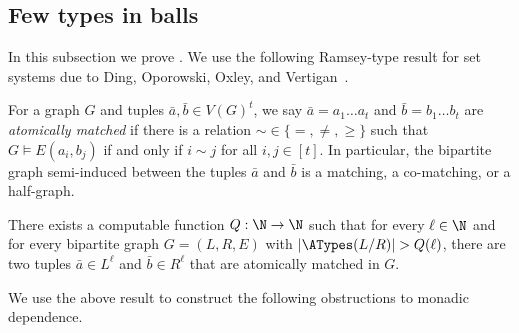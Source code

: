 

\subsection{Few types in balls}\label{sec:few-types-in-balls}
In this subsection we prove .
We use the following Ramsey-type result for set systems due to Ding, Oporowski, Oxley, and Vertigan~\cite{DBLP:journals/jct/DingOOV96}.

\begin{definition}
    For a graph $G$ and tuples $\bar a, \bar b \in V(G)^t$, we say $\bar a = a_1 \ldots a_t$ and $\bar b = b_1 \ldots b_t$ are \emph{atomically matched}
    if there is a relation ${\sim} \in \{=,\neq,\geq\}$ such that $G \models E(a_i, b_j)$ if and only if $i \sim j$ for all $i,j \in [t]$.
    In particular, the bipartite graph semi-induced between the tuples $\bar a$ and $\bar b$ is a matching, a co-matching, or a half-graph.
\end{definition}

\begin{theorem}\label{thm:matching}
    There exists a computable function $Q:\N\rightarrow\N$ such that for every $\ell\in\N$ and for every bipartite graph $G = (L,R,E)$ with
    $|\ATypes(L/R)| > Q(\ell)$, there are two tuples $\bar a \in L^\ell$ and $\bar b \in R^\ell$ that are atomically matched in $G$.
\end{theorem}

We use the above result to construct the following obstructions to monadic dependence.


